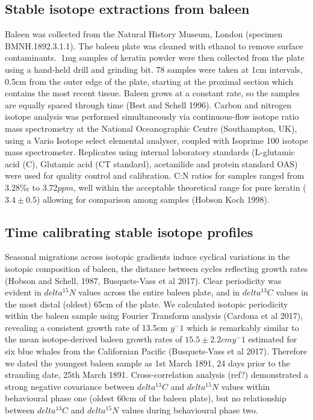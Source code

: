 \documentclass[a4paper,12pt]{article}
\begin{document}
\subsection{Stable isotope extractions from baleen}
Baleen was collected from the Natural History Museum, London (specimen BMNH.1892.3.1.1). 
The baleen plate was cleaned with ethanol to remove surface contaminants. 
$~$1mg samples of keratin powder were then collected from the plate using a hand-held drill and grinding bit. 
78 samples were taken at 1cm intervals, 0.5cm from the outer edge of the plate, starting at the proximal section which contains the most recent tissue. 
Baleen grows at a constant rate, so the samples are equally spaced through time (Best and Schell 1996). Carbon and nitrogen isotope analysis was performed simultaneously via continuous-flow isotope ratio mass spectrometry at the National Oceanographic Centre (Southampton, UK), using a Vario Isotope select elemental analyser, coupled with Isoprime 100 isotope mass spectrometer. 
Replicates using internal laboratory standards (L-glutamic acid (C), Glutamic acid (CT standard), acetanilide and protein standard OAS) were used for quality control and calibration. 
C:N ratios for samples ranged from 3.28$‰$ to 3.72$ppm$, well within the acceptable theoretical range for pure keratin ($3.4\pm0.5$) allowing for comparison among samples (Hobson  Koch 1998). 
 
\subsection{Time calibrating stable isotope profiles}
Seasonal migrations across isotopic gradients induce cyclical variations in the isotopic composition of baleen, the distance between cycles reflecting growth rates  (Hobson and Schell, 1987, Busquets-Vass et al 2017). 
Clear periodicity was evident in $delta^15N$ values across the entire baleen plate, and in $delta^13C$ values in the most distal (oldest) 65cm of the plate. 
We calculated isotopic periodicity within the baleen sample using Fourier Transform analysis (Cardona et al 2017), revealing a consistent growth rate of 13.5cm $y^-1$ which is remarkably similar to the mean isotope-derived baleen growth rates of $15.5 \pm 2.2cm y^-1$ estimated for six blue whales from the Californian Pacific (Busquets-Vass et al 2017).  
Therefore we dated the youngest baleen sample as 1st March 1891, 24 days prior to the stranding date, 25th March 1891. Cross-correlation analysis (ref?) demonstrated a strong negative covariance between $delta^13C$ and $delta^15N$ values within behavioural phase one (oldest 60cm of the baleen plate), but no relationship between $delta^13C$ and $delta^15N$ values during behavioural phase two.
 
\end{document}
